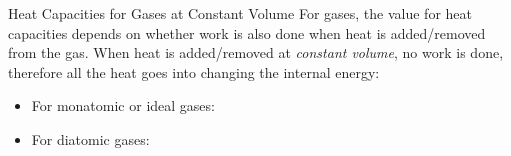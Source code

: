 \documentclass[12pt,aspectratio=169,dvipsnames]{beamer}
\begin{document}
\begin{frame}{Heat Capacities for Gases at Constant Volume}
  For gases, the value for heat capacities depends on whether work is also
  done when heat is added/removed from the gas. When heat is added/removed at
  \emph{constant volume}, no work is done, therefore all the heat goes into
  changing the internal energy:

  \begin{itemize}
  \item For monatomic or ideal gases:
    
    
  \item For diatomic gases:
    
  \end{itemize}
\end{frame}



%
%
\end{document}
